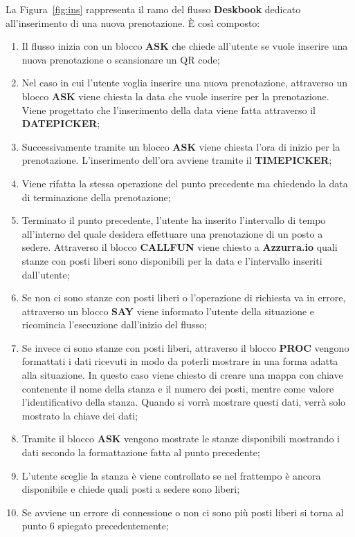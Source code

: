 La Figura~\ref{fig:ins} rappresenta il ramo del flusso \textbf{Deskbook} dedicato all'inserimento di una nuova prenotazione. È così composto:
\begin{enumerate}
	\item Il flusso inizia con un blocco \textbf{ASK} che chiede all'utente se vuole inserire una nuova prenotazione o scansionare un QR code;
	\item Nel caso in cui l'utente voglia inserire una nuova prenotazione, attraverso un blocco \textbf{ASK} viene chiesta la data che vuole inserire per la prenotazione. Viene progettato che l'inserimento della data viene fatta attraverso il \textbf{DATEPICKER};
	\item Successivamente tramite un blocco \textbf{ASK} viene chiesta l'ora di inizio per la prenotazione. L'inserimento dell'ora avviene tramite il \textbf{TIMEPICKER};
	\item Viene rifatta la stessa operazione del punto precedente ma chiedendo la data di terminazione della prenotazione;
	\item Terminato il punto precedente, l'utente ha inserito l'intervallo di tempo all'interno del quale desidera effettuare una prenotazione di un posto a sedere. Attraverso il blocco \textbf{CALLFUN} viene chiesto a \textbf{Azzurra.io} quali stanze con posti liberi sono disponibili per la data e l'intervallo inseriti dall'utente;
	\item Se non ci sono stanze con posti liberi o l'operazione di richiesta va in errore, attraverso un blocco \textbf{SAY} viene informato l'utente della situazione e ricomincia l'esecuzione dall'inizio del flusso;
	\item Se invece ci sono stanze con posti liberi, attraverso il blocco \textbf{PROC} vengono formattati i dati ricevuti in modo da poterli mostrare in una forma adatta alla situazione. In questo caso viene chiesto di creare una mappa con chiave contenente il nome della stanza e il numero dei posti, mentre come valore l'identificativo della stanza. Quando si vorrà mostrare questi dati, verrà solo mostrato la chiave dei dati;
	\item Tramite il blocco \textbf{ASK} vengono mostrate le stanze disponibili mostrando i dati secondo la formattazione fatta al punto precedente;
	\item L'utente sceglie la stanza è viene controllato se nel frattempo è ancora disponibile e chiede quali posti a sedere sono liberi;
	\item Se avviene un errore di connessione o non ci sono più posti liberi si torna al punto 6 spiegato precedentemente;

\end{enumerate}
